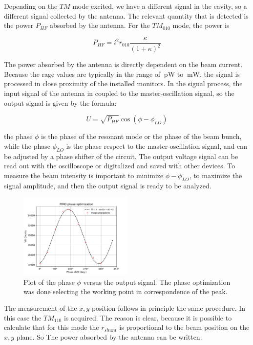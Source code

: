 Depending on the $TM$ mode excited, we have a different signal in the cavity, so a different signal collected by the antenna. The relevant quantity that is detected is the power $P_{HF}$ absorbed by the antenna. For the $TM_{010}$ mode, the power is 

\begin{equation}
P_{HF} = i^{2} r_{010} \frac{\kappa}{(1 + \kappa)^{2}}
\end{equation}

The power absorbed by the antenna is directly dependent on the beam current. Because the rage values are typically in the range of $\SI{}{\pico \watt}$ to $\SI{}{\milli \watt }$, the signal is processed in close proximity of the installed monitors. In the signal process, the input signal of the antenna in coupled to the master-oscillation signal, so the output signal is given by the formula:

\begin{equation}
U = \sqrt{P_{HF}} \cos(\phi - \phi_{LO})
\end{equation}

the phase $\phi$ is the phase of the resonant mode or the phase of the beam bunch, while the phase $\phi_{LO}$ is the phase respect to the master-oscillation signal, and can be adjusted by a phase shifter of the circuit. The output voltage signal can be read out with the oscilloscope or digitalized and saved with other devices. To measure the beam intensity is important to minimize $\phi - \phi_{LO}$, to maximize the signal amplitude, and then the output signal is ready to be analyzed.

\begin{figure}[hbtp]
\centering
\includegraphics[width = 0.5\textwidth]{ExperimentalSetup/PIMOphase.pdf}
\caption{Plot of the phase $\phi$ versus the output signal. The phase optimization was done selecting the working point in correspondence of the peak.}
\end{figure}

The measurement of the $x,y$ position follows in principle the same procedure. In this case the $TM_{110}$ is acquired. The reason is clear, because it is possible to calculate that for this mode the $r_{shunt}$ is proportional to the beam position on the $x,y$ plane. So The power absorbed by the antenna can be written:

